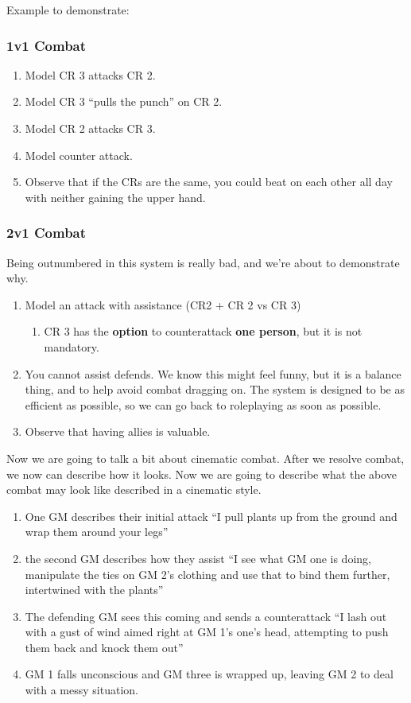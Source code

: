 \documentclass[green]{GL2020}
\begin{document}
Example to demonstrate:


\subsubsection*{1v1 Combat}
\begin{enumerate}
	\item Model CR 3 attacks CR 2.
	\item Model CR 3 ``pulls the punch'' on CR 2.
	\item Model CR 2 attacks CR 3.
	\item Model counter attack.
	
	\item Observe that if the CRs are the same, you could beat on each other all day with neither gaining the upper hand.
\end{enumerate}

\subsubsection*{2v1 Combat}
Being outnumbered in this system is really bad, and we're about to demonstrate why.
\begin{enumerate}
	\item Model an attack with assistance (CR2 + CR 2 vs CR 3)
	\begin{enumerate}
		\item CR 3 has the \textbf{option} to counterattack \textbf{one person}, but it is not mandatory.
	\end{enumerate}
	\item You cannot assist defends. We know this might feel funny, but it is a balance thing, and to help avoid combat dragging on. The system is designed to be as efficient as possible, so we can go back to roleplaying as soon as possible.
	\item Observe that having allies is valuable.
\end{enumerate}


Now we are going to talk a bit about cinematic combat.  After we resolve combat, we now can describe how it looks.  Now we are going to describe what the above combat may look like described in a cinematic style.
\begin{enumerate}
	\item One GM describes their initial attack “I pull plants up from the ground and wrap them around your legs”
	\item the second GM describes how they assist “I see what GM one is doing, manipulate the ties on GM 2’s clothing and use that to bind them further, intertwined with the plants”
	\item The defending GM sees this coming and sends a counterattack “I lash out with a gust of wind aimed right at GM 1’s one’s head, attempting to push them back and knock them out”
	\item GM 1 falls unconscious and GM three is wrapped up, leaving GM 2 to deal with a messy situation.
\end{enumerate}
\end{document}
